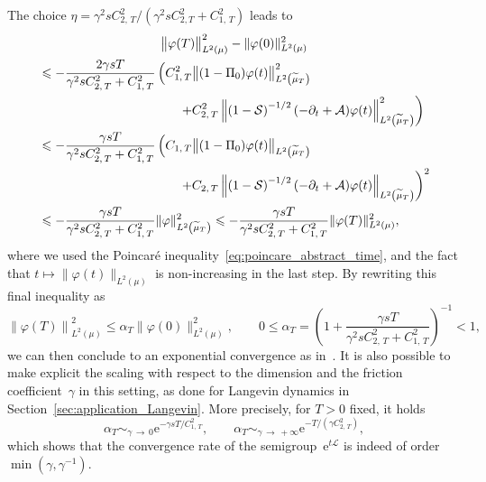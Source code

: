 \documentclass[AHL,Unicode,longabstracts,MathTools,published]{cedram}
\newcommand{\rme}{\mathrm{e}}
\newcommand{\cL}{\mathcal{L}}
\newcommand{\cLs}{\mathcal{S}}
\newcommand{\cLa}{\mathcal{A}}
\renewcommand{\leq}{\leqslant}
\begin{document}
The choice $\eta = \gamma^2 s C_{2,\,T}^2/(\gamma^2 sC_{2,T}^2 + C_{1,\,T}^2)$ leads to
\begin{multline*}
\big\|\varphi(T)\big\|_{L^2(\mu)}^2 - \|\varphi(0)\|_{L^2(\mu)}^2 \\
\begin{aligned}
& \leq -\frac{2\gamma sT}{\gamma^2 sC_{2,\,T}^2 + C_{1,\,T}^2} \left(C_{1,\,T}^2 \big\| (1-\Pi_0) \varphi(t) \big\|_{L^2\left(\widetilde{\mu}_T\right)}^2\right.\\
&\mkern200mu\left. + C_{2,\,T}^2\left\| \left(1-\cLs\right)^{-1/2}(-\partial_t + \cLa) \varphi(t) \right\|_{L^2\left(\widetilde{\mu}_T\right)}^2\right) \\
& \leq -\frac{\gamma sT}{\gamma^2 sC_{2,\,T}^2 + C_{1,\,T}^2} \left(C_{1,\,T} \big\| (1-\Pi_0) \varphi(t) \big\|_{L^2\left(\widetilde{\mu}_T\right)}\right.
\\
&\mkern200mu\left. + C_{2,\,T}\left\| \left(1-\cLs\right)^{-1/2}(-\partial_t + \cLa) \varphi(t) \right\|_{L^2\left(\widetilde{\mu}_T\right)}\right)^2 \\
& \leq -\frac{\gamma sT}{\gamma^2 sC_{2,\,T}^2 + C_{1,\,T}^2} \|\varphi\|_{L^2\left(\widetilde{\mu}_T\right)}^2 \leq -\frac{\gamma s T}{\gamma^2 sC_{2,\,T}^2 + C_{1,\,T}^2} \|\varphi(T)\|_{L^2(\mu)}^2,
\end{aligned}
\end{multline*}
where we used the Poincaré inequality~\eqref{eq:poincare_abstract_time}, and the fact that $t \mapsto \|\varphi(t)\|_{L^2(\mu)}$ is non-increasing in the last step. By rewriting this final inequality as
\[
\left\|\varphi(T)\right\|_{L^2(\mu)}^2 \leq \alpha_T \|\varphi(0)\|_{L^2(\mu)}^2, \qquad 0 \leq \alpha_T = \left(1+\frac{\gamma sT}{\gamma^2 sC_{2,\,T}^2 + C_{1,\,T}^2}\right)^{-1} < 1,
\]
we can then conclude to an exponential convergence as in~\cite{AM19,CLW19}. It is also possible to make explicit the scaling with respect to the dimension and the friction coefficient~$\gamma$ in this setting, as done for Langevin dynamics in Section~\ref{sec:application_Langevin}. More precisely, for $T>0$ fixed, it holds
\[
\alpha_T \mathop{\sim}_{\gamma\,\to\,0} \rme^{-\gamma s T/C_{1,\,T}^2}, \qquad \alpha_T \mathop{\sim}_{\gamma\,\to\,+\infty} \rme^{-T/\left(\gamma C_{2,\,T}^2\right)},
\]
which shows that the convergence rate of the semigroup~$\rme^{t \cL}$ is indeed of order $\min(\gamma,\gamma^{-1})$.
\end{document}
